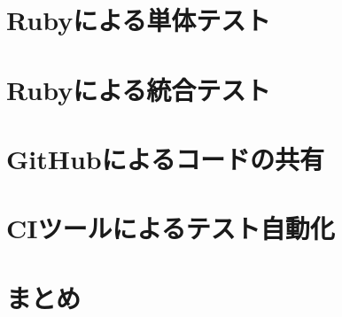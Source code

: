 \documentclass[t, aspectratio=169]{beamer}
\begin{document}
\part{Rubyによる単体テスト}
\label{sec-3}

\part{Rubyによる統合テスト}
\label{sec-4}

\part{GitHubによるコードの共有}
\label{sec-5}

\part{CIツールによるテスト自動化}
\label{sec-6}

\part{まとめ}
\label{sec-7}
\end{document}
